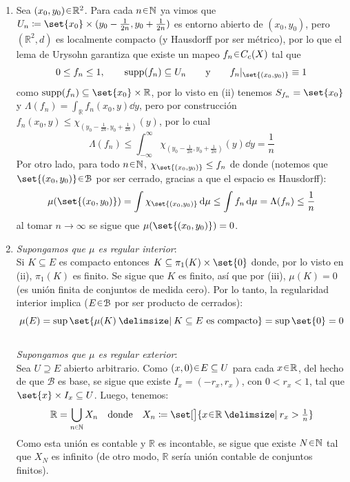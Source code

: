 \begin{sol}
\begin{enumerate}[label=(\roman*),leftmargin=1.5em]
\item %
Sea $(x_0,y_0)\en\mathbb{R}^2$. Para cada $n\en\mathbb{N}$ ya vimos que $U_n\coloneq \set{x_0} \times (y_0-\frac{1}{2n},y_0+\frac{1}{2n})$ es entorno abierto de $(x_0,y_0)$, pero $(\mathbb{R}^2,d)$ es localmente compacto (y Hausdorff por ser métrico), por lo que el lema de Urysohn garantiza que existe un mapeo $f_n \en C_c(X)$ tal que
\[
0 \leq f_n \leq 1,
\qquad
\supp(f_n) \subseteq U_n
\qquad\text{y}\qquad
f_n|_{\set{(x_0,y_0)}} \equiv 1
\]
como $\supp(f_n) \subseteq \set{x_0} \times \mathbb{R}$, por lo visto en (ii) tenemos $S_{f_n} = \set{x_0}$ y $\Lambda(f_n) = \int_{\mathbb{R}} f_n(x_0,y) \dd{y}$, pero por construcción $f_n(x_0,y) \le \chi_{(y_0-\frac{1}{2n},y_0+\frac{1}{2n})}(y)$, por lo cual
\[
\Lambda(f_n) 
\le \int^\infty_{-\infty} \chi_{(y_0-\frac{1}{2n},y_0+\frac{1}{2n})}(y) \dd{y}
= \frac{1}{n}
\]
Por otro lado, para todo $n\en\mathbb{N}$, $\chi_{\set{(x_0,y_0)}} \le f_n$ de donde (notemos que $\set{(x_0,y_0)}\en\mathcal{B}$ por ser cerrado, gracias a que el espacio es Hausdorff):
\[
\mu(\set{(x_0,y_0)}) 
= \int\chi_{\set{(x_0,y_0)}} \dd{\mu} \le \int f_n \dd{\mu} = \Lambda(f_n) \le \frac{1}{n} 
\]
al tomar $n\to\infty$ se sigue que $\mu(\set{(x_0,y_0)}) =0 $.
\item %
\emph{Supongamos que $\mu$ es regular interior}:\\
Si $K\subseteq E$ es compacto entonces $K \subseteq \pi_1(K) \times \set{0}$ donde, por lo visto en (ii), $\pi_1(K)$ es finito. Se sigue que $K$ es finito, así que por (iii), $\mu(K) = 0$ (es unión finita de conjuntos de medida cero). Por lo tanto, la regularidad interior implica ($E\en\mathcal{B}$ por ser producto de cerrados):
\[
\mu(E) = \sup\set{\mu(K) \given K\subseteq E \text{ es compacto}} = \sup\set{0} = 0
\]
\\
\emph{Supongamos que $\mu$ es regular exterior}:\\
Sea $U \supseteq E$ abierto arbitrario. Como $(x,0) \en E \subseteq U$ para cada $x\en\mathbb{R}$, del hecho de que $\mathscr{B}$ es base, se sigue que existe $I_x = (-r_x,r_x)$, con $0 < r_x< 1$, tal que $\set{x} \times I_x \subseteq U$. Luego, tenemos:
\[
\mathbb{R} = \bigcup_{n\en\mathbb{N}} X_n
\quad\text{donde}\quad
X_n \coloneq \set[\big]{x\en\mathbb{R} \given r_x > \tfrac{1}{n}}
\]
Como esta unión es contable y $\mathbb{R}$ es incontable, se sigue que existe $N\en\mathbb{N}$ tal que $X_N$ es infinito (de otro modo, $\mathbb{R}$ sería unión contable de conjuntos finitos).\par

\end{enumerate}
\end{sol}

